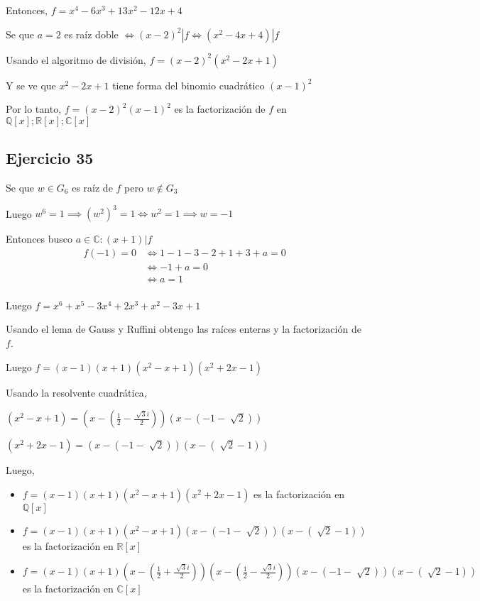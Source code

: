 Entonces, $ f = x^4 - 6x^3 + 13x^2 - 12x + 4 $

Se que $ a = 2 $ es raíz doble $ \iff (x-2)^2 | f \iff (x^2-4x+4) | f $

Usando el algoritmo de división, $ f = (x-2)^2(x^2-2x+1) $

Y se ve que $ x^2-2x+1 $ tiene forma del binomio cuadrático $ (x-1)^2 $

Por lo tanto, $ f = (x-2)^2(x-1)^2 $ es la factorización de $f$ en $ \mathbb{Q}[x]; \mathbb{R}[x]; \mathbb{C}[x] $

\subsection{Ejercicio 35}

Se que $ w \in G_6 $ es raíz de $f$ pero $ w \not \in G_3 $

Luego $ w^6 = 1 \implies (w^2)^3 = 1 \iff w^2 = 1 \implies w=-1 $

Entonces busco $ a \in \mathbb{C}: (x+1)|f $
\begin{align*}
    f(-1) = 0 &\iff 1 - 1 -3 -2 +1 +3 +a =0 \\ 
    &\iff -1 + a =0 \\ 
    &\iff a = 1 \\ 
\end{align*}

Luego $ f = x^6 + x^5 - 3x^4 + 2x^3 + x^2 -3x + 1 $

Usando el lema de Gauss y Ruffini obtengo las raíces enteras y la factorización de $f$.

Luego $ f = (x - 1) (x + 1) (x^2 - x + 1) (x^2 + 2 x - 1) $

Usando la resolvente cuadrática,

$ (x^2 - x + 1) = (x-(\frac{1}{2} - \frac{\sqrt[]{3}i}{2}))(x-(-1-\sqrt[]{2})) $

$ (x^2 + 2 x - 1) = (x-(-1-\sqrt[]{2}))(x-(\sqrt[]{2} - 1)) $

Luego,
\begin{itemize}
    \item $ f = (x - 1) (x + 1) (x^2 - x + 1) (x^2 + 2 x - 1) $ es la factorización en $ \mathbb{Q}[x] $
    \item $ f = (x - 1) (x + 1) (x^2 - x + 1) (x-(-1-\sqrt[]{2}))(x-(\sqrt[]{2} - 1)) $ es la factorización en $ \mathbb{R}[x] $
    \item $ f = (x - 1) (x + 1)(x-(\frac{1}{2} + \frac{\sqrt[]{3}i}{2}))(x-(\frac{1}{2} - \frac{\sqrt[]{3}i}{2}))(x-(-1-\sqrt[]{2}))(x-(\sqrt[]{2} - 1)) $ es la factorización en $ \mathbb{C}[x] $
\end{itemize}

